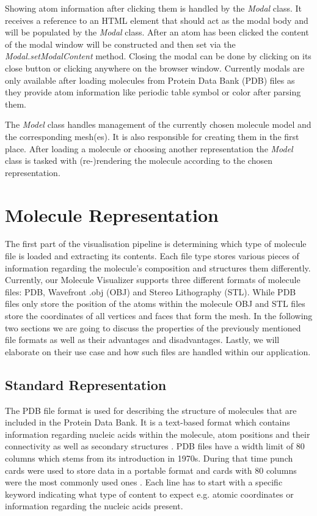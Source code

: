 Showing atom information after clicking them is handled by the \textit{Modal} class. It receives a reference to an HTML element that should act as the modal body and will be populated by the \textit{Modal} class. After an atom has been clicked the content of the modal window will be constructed and then set via the \textit{Modal.setModalContent} method. Closing the modal can be done by clicking on its close button or clicking anywhere on the browser window. Currently modals are only available after loading molecules from Protein Data Bank (PDB) files as they provide atom information like periodic table symbol or color after parsing them. 

The \textit{Model} class handles management of the currently chosen molecule model and the corresponding mesh(es). It is also responsible for creating them in the first place. After loading a molecule or choosing another representation the \textit{Model} class is tasked with (re-)rendering the molecule according to the chosen representation. 

\section{Molecule Representation}
\label{sec:implementation:molrepr}

The first part of the visualisation pipeline is determining which type of molecule file is loaded and extracting its contents. Each file type stores various pieces of information regarding the molecule's composition and structures them differently. Currently, our Molecule Visualizer supports three different formats of molecule files: PDB, Wavefront .obj \cite{article} (OBJ) and Stereo Lithography \cite{BibEntry2019Sep} (STL). While PDB files only store the position of the atoms within the molecule OBJ and STL files store the coordinates of all vertices and faces that form the mesh. In the following two sections we are going to discuss the properties of the previously mentioned file formats as well as their advantages and disadvantages. Lastly, we will elaborate on their use case and how such files are handled within our application.

\subsection{Standard Representation}
\label{sec:implementation:molrepr:pdb}

The PDB file format is used for describing the structure of molecules that are included in the Protein Data Bank. It is a text-based format which contains information regarding nucleic acids within the molecule, atom positions and their connectivity as well as secondary structures \cite{BibEntry2022Jan}. PDB files have a width limit of 80 columns which stems from its introduction in 1970s. During that time punch cards were used to store data in a portable format and cards with 80 columns were the most commonly used ones \cite{Maxfield2011Oct}. Each line has to start with a specific keyword indicating what type of content to expect e.g. atomic coordinates or information regarding the nucleic acids present.

